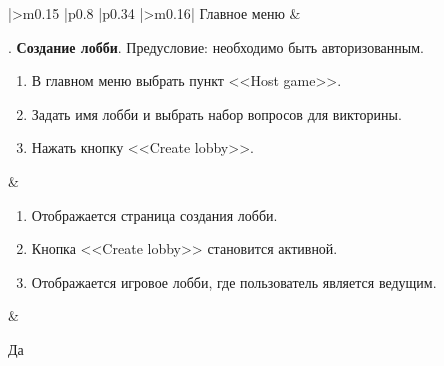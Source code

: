 \begin{landscape}
\begin{longtable}[l]{|>{\centering}m{0.15\textwidth}
					  |p{0.8\textwidth}
					  |p{0.34\textwidth}
					  |>{\centering\arraybackslash}m{0.16\textwidth}|}
	Главное меню &
	\begin{minipage}[t]{1\linewidth}
		\vspace{-1\baselineskip}
		\testnumber. \textbf{Создание лобби}.\newline
 		Предусловие: необходимо быть авторизованным.
 		\begin{enumerate}
 			\item В главном меню выбрать пункт <<Host game>>.
 			\item Задать имя лобби и выбрать набор вопросов для викторины.
    		\item Нажать кнопку <<Create lobby>>.
 		\end{enumerate}
 	\end{minipage} &
	\begin{minipage}[t]{1\linewidth}
		\vspace{-1\baselineskip}
		\begin{enumerate}
			\item Отображается страница создания лобби.
			\item Кнопка <<Create lobby>> становится активной.
   			\item Отображается игровое лобби, где пользователь является ведущим.
		\end{enumerate}
	\end{minipage} &
	\begin{minipage}[t]{1\linewidth}
		\vspace{-1\baselineskip}
		\centering Да
	\end{minipage} \\



\end{longtable}
\end{landscape}
